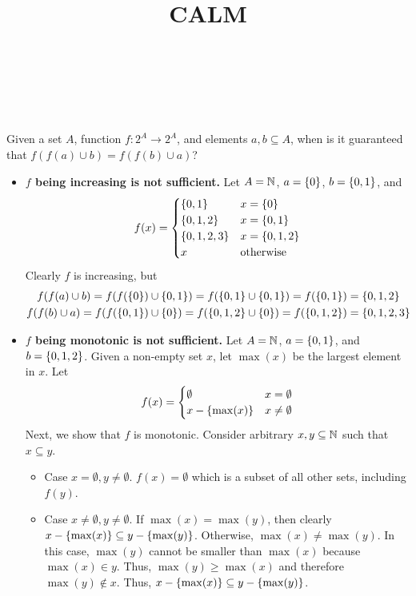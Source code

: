 \documentclass{mwhittaker}
\title{CALM}
\author{\ }
\date{\ }
\begin{document}
\maketitle
Given a set $A$, function $f: 2^A \to 2^A$, and elements $a, b \subseteq A$,
when is it guaranteed that $f(f(a) \cup b) = f(f(b) \cup a)$?

\begin{itemize}
  \item \textbf{$f$ being increasing is not sufficient.}
    Let $A = \mathbb{N}$, $a = \{0\}$, $b = \{0, 1\}$, and \[
      f(x) = \begin{cases}
        \{0, 1\} & x = \{0\} \\
        \{0, 1, 2\} & x = \{0, 1\} \\
        \{0, 1, 2, 3\} & x = \{0, 1, 2\} \\
        x & \text{otherwise} \\
      \end{cases}
    \]
    Clearly $f$ is increasing, but
    \begin{gather*}
      f(f(a) \cup b)
        = f(f(\{0\}) \cup \{0, 1\})
        = f(\{0, 1\} \cup \{0, 1\})
        = f(\{0, 1\})
        = \{0, 1, 2\} \\
      f(f(b) \cup a)
        = f(f(\{0, 1\}) \cup \{0\})
        = f(\{0, 1, 2\} \cup \{0\})
        = f(\{0, 1, 2\})
        = \{0, 1, 2, 3\}
    \end{gather*}

  \item \textbf{$f$ being monotonic is not sufficient.}
    Let $A = \mathbb{N}$, $a = \{0, 1\}$, and $b = \{0, 1, 2\}$. Given a
    non-empty set $x$, let $\max(x)$ be the largest element in $x$. Let \[
      f(x) = \begin{cases}
        \emptyset & x = \emptyset \\
        x - \{\max(x)\} & x \neq \emptyset
      \end{cases}
    \]
    Next, we show that $f$ is monotonic. Consider arbitrary $x, y \subseteq
    \mathbb{N}$ such that $x \subseteq y$.
    \begin{itemize}
      \item Case $x = \emptyset, y \neq \emptyset$.
        $f(x) = \emptyset$ which is a subset of all other sets, including
        $f(y)$.

      \item Case $x \neq \emptyset, y \neq \emptyset$.
        If $\max(x) = \max(y)$, then clearly $x - \{\max(x)\} \subseteq y -
        \{\max(y)\}$. Otherwise, $\max(x) \neq \max(y)$. In this case,
        $\max(y)$ cannot be smaller than $\max(x)$ because $\max(x) \in y$.
        Thus, $\max(y) \geq \max(x)$ and therefore $\max(y) \notin x$. Thus, $x
        - \{\max(x)\} \subseteq y - \{\max(y)\}$.


\end{itemize}
\end{itemize}
\end{document}
